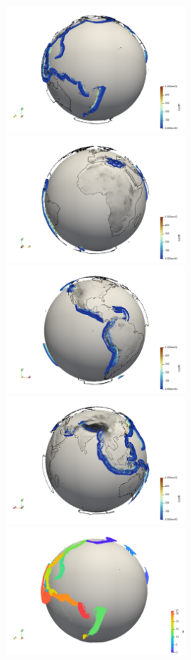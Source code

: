 \begin{center}
\includegraphics[width=6.7cm]{python_codes/fieldstone_135/images/view1.png}
\includegraphics[width=6.7cm]{python_codes/fieldstone_135/images/view2.png}\\
\includegraphics[width=6.7cm]{python_codes/fieldstone_135/images/view3.png}
\includegraphics[width=6.7cm]{python_codes/fieldstone_135/images/view4.png}\\
\includegraphics[width=6.7cm]{python_codes/fieldstone_135/images/id1.png}

\end{center}
